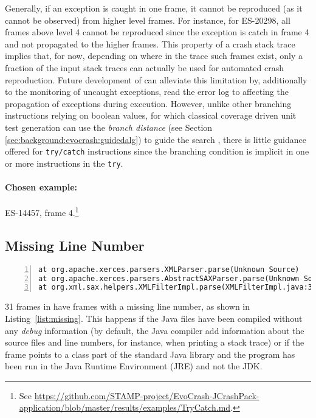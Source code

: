 Generally, if an exception is caught in one frame, it cannot be reproduced (as it cannot be observed) from higher level frames. For instance, for ES-20298, all frames above level 4 cannot be reproduced since the exception is catch in frame 4 and not propagated to the higher frames. 
This property of a crash stack trace implies that, for now, depending on where in the trace such frames exist, only a fraction of the input stack traces can actually be used for automated crash reproduction.
Future development of \evocrash can alleviate this limitation by, additionally to the monitoring of uncaught exceptions, read the error log to affecting the propagation of exceptions during execution. 
However, unlike other branching instructions relying on boolean values, for which classical coverage driven unit test generation can use the \emph{branch distance} (see Section \ref{sec:background:evocrash:guidedalg}) to guide the search \cite{McMinn2004}, there is little guidance offered for \texttt{try/catch} instructions since the branching condition is implicit in one or more instructions in the \texttt{try}. 

\paragraph{Chosen example:} 
ES-14457, frame 4.\footnote{See \url{https://github.com/STAMP-project/EvoCrash-JCrashPack-application/blob/master/results/examples/TryCatch.md}.}


\subsection{Missing Line Number}

\begin{lstlisting}[frame=tb,
  float=t,
  caption=An excerpt of the stack trace from the crash XRENDERING-422  with missing line numbers,
  label=list:missing,
  captionpos=t,
  basicstyle={\scriptsize\ttfamily},
  numbers=left,
  breaklines=true,
  breakatwhitespace=false,
  tabsize=3]
at org.apache.xerces.parsers.XMLParser.parse(Unknown Source)
at org.apache.xerces.parsers.AbstractSAXParser.parse(Unknown Source)
at org.xml.sax.helpers.XMLFilterImpl.parse(XMLFilterImpl.java:357)
\end{lstlisting}

31 frames in \crashpack have frames with a missing line number, as shown in Listing~\ref{list:missing}.
This happens if the Java files have been compiled without any \emph{debug} information (by default, the Java compiler add information about the source files and line numbers, for instance, when printing a stack trace) or if the frame points to a class part of the standard Java library and the program has been run in the Java Runtime Environment (JRE) and not the JDK.

